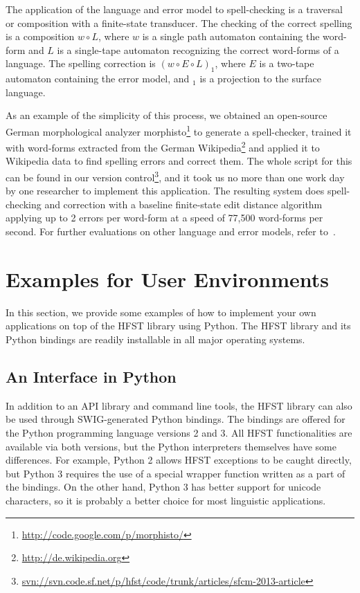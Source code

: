 \documentclass{llncs}
\begin{document}
The application of the language and error model to spell-checking is a
traversal or composition with a finite-state transducer. The checking of the correct spelling
is a composition $w \circ L$, where $w$ is a single path automaton containing
the word-form and $L$ is a single-tape automaton recognizing the correct
word-forms of a language. The spelling correction is $(w \circ E \circ L)_1$,
where $E$ is a two-tape automaton containing the error model, and $_1$ is
a projection to the surface language.

As an example of the simplicity of this process, we obtained an open-source
German morphological analyzer
morphisto\footnote{\url{http://code.google.com/p/morphisto/}} to generate a
spell-checker, trained it with word-forms extracted from the German
Wikipedia\footnote{\url{http://de.wikipedia.org}} and applied it to Wikipedia
data to find spelling errors and correct them. The whole script for this can be found
in our version
control\footnote{\url{svn://svn.code.sf.net/p/hfst/code/trunk/articles/sfcm-2013-article}},
and it took us no more than one work day by one researcher to implement this
application.  The resulting system does spell-checking and correction with
a baseline finite-state edit distance algorithm~\cite{pirinen2010finitestate}
applying up to 2 errors per word-form at a speed of 77,500 word-forms per second.
For further evaluations on other language and error models, refer
to~\cite{pirinen2012improving}.

\section{Examples for User Environments}\label{hfst:env-examples}

In this section, we provide some examples of how to implement your own applications on top of the HFST library using Python. The HFST library and its Python bindings are readily installable in all major operating systems.

\subsection{An Interface in Python}

In addition to an API library and command line tools, the HFST library can
also be used through SWIG-generated Python bindings. The bindings are
offered for the Python programming language versions 2 and 3. All HFST
functionalities are available via both versions, but the Python
interpreters themselves have some differences. For example, Python 2
allows HFST exceptions to be caught directly, but Python 3 requires
the use of a special wrapper function written as a part of the
bindings. On the other hand, Python 3 has better support for unicode
characters, so it is probably a better choice for most linguistic
applications.
\end{document}
